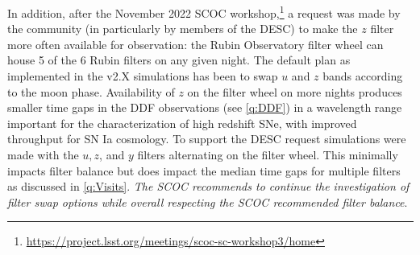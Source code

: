 In addition, after the November 2022 SCOC workshop,\footnote{\url{https://project.lsst.org/meetings/scoc-sc-workshop3/home}} a request was made by the community (in particularly by members of the DESC) to make the $z$  filter more often available for observation: the Rubin Observatory filter wheel can house 5 of the 6 Rubin filters on any given night. The default plan as implemented in the v2.X simulations has been to swap $u$ and $z$ bands according to the moon phase. Availability of $z$ on the filter wheel on more nights produces smaller time gaps in the DDF observations (see \autoref{q:DDF}) in a wavelength range important for the characterization of high redshift SNe, with improved throughput for SN Ia cosmology. To support the DESC request simulations were made with the $u, z$, and $y$ filters alternating on the filter wheel. This minimally impacts filter balance but does impact the median time gaps for multiple filters as discussed in \autoref{q:Visits}. \emph{The SCOC recommends to continue the investigation of filter swap options while overall respecting the SCOC recommended filter balance}. 
